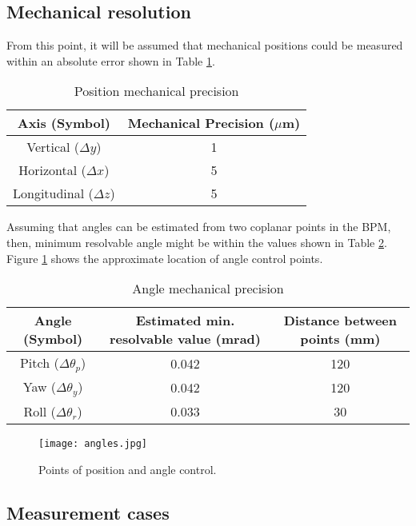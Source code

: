 \subsection{Mechanical resolution}
From this point, it will be assumed that mechanical positions could be measured within an absolute error shown in Table \ref{mechprec}.\par
\begin{table}[htb]
\begin{center}
 \begin{tabular}{|c|c|}\hline
  Axis (Symbol) & Mechanical Precision ($\mu$m)\\\hline
  Vertical ($\Delta y$)& 1\\
  Horizontal ($\Delta x$) & 5\\
  Longitudinal ($\Delta z$) & 5 \\\hline
 \end{tabular}\caption{Position mechanical precision}\label{mechprec}
 \end{center}
\end{table}
Assuming that angles can be estimated from two coplanar points in the BPM, then, minimum resolvable angle might be within the values shown in Table \ref{angleprec}. Figure \ref{PAcontrol} shows the approximate location of angle control points.\par
\begin{table}[htb]
 \begin{center}
  \begin{tabular}{|c|c|c|}\hline
  Angle (Symbol) & Estimated min. resolvable value (mrad) & Distance between points (mm)\\\hline
   Pitch ($\Delta\theta_p$)&0.042&120\\
   Yaw ($\Delta\theta_y$)&0.042&120\\
   Roll ($\Delta\theta_r$)&0.033&30\\\hline
  \end{tabular}\caption{Angle mechanical precision}\label{angleprec}
 \end{center}
\end{table}
\begin{figure}[htb]
 \begin{center}
  \texttt{[image: angles.jpg]}\caption{Points of position and angle control.}\label{PAcontrol}
 \end{center}
\end{figure}


\subsection{Measurement cases}
